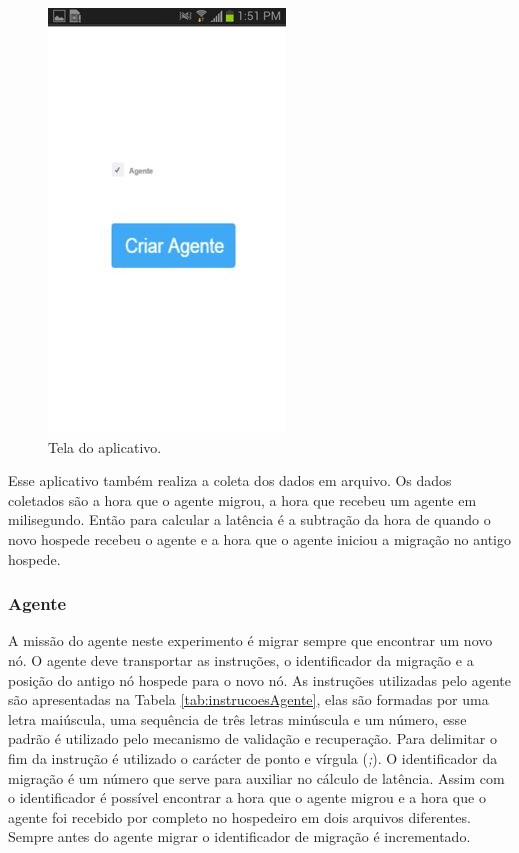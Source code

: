 \begin{figure}[htbp]
	\centering
	\includegraphics[scale=0.5]{metodologia/figuras/appScreen.jpg}
	\caption{Tela do aplicativo.}
	\label{fig:appScreen}
\end{figure}

Esse aplicativo também realiza a coleta dos dados em arquivo. Os dados coletados são a hora que o agente migrou, a hora que recebeu um agente em milisegundo. Então para calcular a latência é a subtração da hora de quando o novo hospede recebeu o agente e a hora que o agente iniciou a migração no antigo hospede.

\subsubsection{Agente}

A missão do agente neste experimento é migrar sempre que encontrar um novo nó. O agente deve transportar as instruções, o identificador da migração e a posição do antigo nó hospede para o novo nó. As instruções utilizadas pelo agente são apresentadas na Tabela \ref{tab:instrucoesAgente}, elas são formadas por uma letra maiúscula, uma sequência de três letras minúscula e um número, esse padrão é utilizado pelo mecanismo de validação e recuperação. Para delimitar o fim da instrução é utilizado o carácter de ponto e vírgula (\emph{;}). O identificador da migração é um número que serve para auxiliar no cálculo de latência. Assim com o identificador é possível encontrar a hora que o agente migrou e a hora que o agente foi recebido por completo no hospedeiro em dois arquivos diferentes. Sempre antes do agente migrar o identificador de migração é incrementado.  

